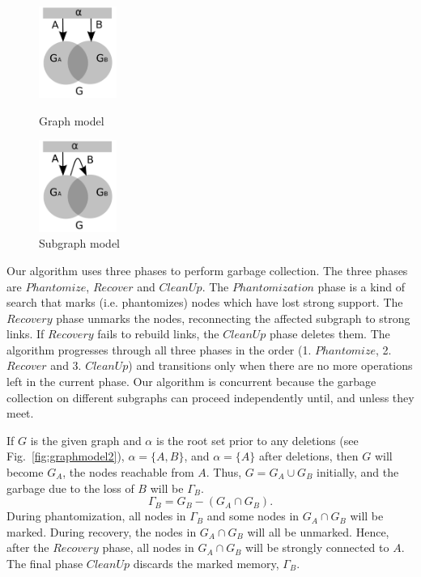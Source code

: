 \begin{figure}[t]
\begin{minipage}[t]{0.5\linewidth}
  \centering
  \includegraphics[height=1.18in]{figs/graphmodel2}
  \caption{Graph model}%
\label{fig:graphmodel2}
\end{minipage}
\begin{minipage}[t]{0.5\linewidth}
  \centering
  \includegraphics[height=1.18in]{figs/graphmodel2b}
  \caption{Subgraph model}%
\label{fig:graphmodel3}
\end{minipage}
\end{figure}

Our algorithm uses three phases to perform garbage collection. The three phases are $Phantomize$, $Recover$ and $CleanUp$. The $Phantomization$ phase is a kind of search that marks (i.e. phantomizes) nodes which have lost strong support. The $Recovery$ phase unmarks the nodes, reconnecting the affected subgraph to strong links. If $Recovery$ fails to rebuild links, the $CleanUp$ phase deletes them. The algorithm progresses through all three phases in the order (1. $Phantomize$, 2. $Recover$ and 3. $CleanUp$) and transitions only when there are no more operations left in the current phase. Our algorithm is concurrent because the garbage collection on different subgraphs can proceed independently until, and unless they meet.

If $G$ is the given graph and $\alpha$ is the root set prior to any deletions (see Fig.~\ref{fig:graphmodel2}), $\alpha = \{A, B\}$, and $\alpha = \{ A \}$ after deletions, then
$G$ will become $G_A$, the nodes reachable from $A$.
Thus, $G = G_A \cup G_B$  initially, and
the garbage due to the loss of  $B$ will be $\Gamma_B$.
$$\Gamma_B = G_B - (G_A \cap G_B).$$
During phantomization, all nodes in $\Gamma_B$ and some nodes in $G_A \cap G_B$ will be marked. During recovery, the nodes in $G_A \cap G_B$ will all be unmarked. Hence,
after the $Recovery$ phase, all nodes in $G_A \cap G_B$ will be strongly connected to $A$.
The final phase $CleanUp$ discards the marked memory, $\Gamma_B$.


